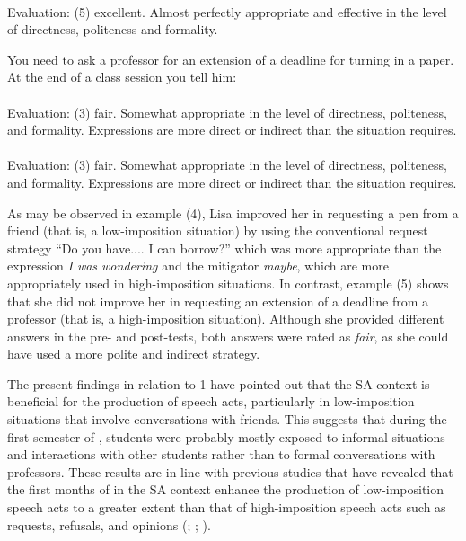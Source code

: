 \documentclass[output=paper]{langsci/langscibook}
\begin{document}
  \\
  \textup{Evaluation}: (5) excellent. Almost perfectly appropriate and effective in the level of directness, politeness and formality.\\
  \z
\z

\ea
{You need to ask a professor for an extension of a deadline for turning in a paper. At the end of a class session you tell him:} \\
  \\
  \textup{Evaluation}: (3) fair. Somewhat appropriate in the level of directness, politeness, and formality. Expressions are more direct or indirect than the situation requires.\\
  
  \\
  \textup{Evaluation}: (3) fair. Somewhat appropriate in the level of directness, politeness, and formality. Expressions are more direct or indirect than the situation requires.\\
  \z
\z

As may be observed in example (4), Lisa improved her  in requesting a pen from a friend (that is, a low-imposition situation) by using the conventional request strategy “Do you have.... I can borrow?”  which was more appropriate than the expression \textit{I was wondering} and the mitigator \textit{maybe}, which are more appropriately used in high-imposition situations. In contrast, example (5) shows that she did not improve her  in requesting an extension of a deadline from a professor (that is, a high-imposition situation). Although she provided different answers in the pre- and post-tests, both answers were rated as \textit{fair}, as she could have used a more polite and indirect strategy.

The present findings in relation to  1 have pointed out that the SA context is beneficial for the production of speech acts, particularly in low-imposition situations that involve conversations with friends. This suggests that during the first semester of , students were probably mostly exposed to informal situations and interactions with other students rather than to formal conversations with professors. These results are in line with previous studies that have revealed that the first months of  in the SA context enhance the production of low-imposition speech acts to a greater extent than that of high-imposition speech acts such as requests, refusals, and opinions (\citealt{Taguchi2006}; \citeyear{Taguchi2011}; \citeyear{Taguchi2013}).
\end{document}

